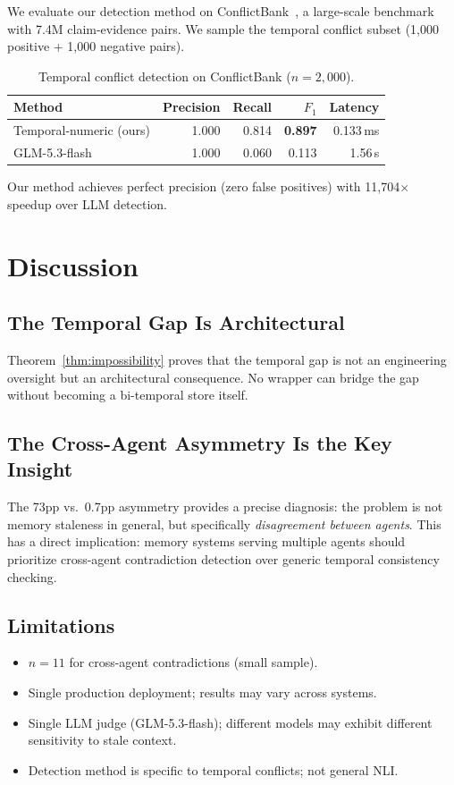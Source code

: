 \documentclass{article}
\begin{document}
We evaluate our detection method on ConflictBank~\cite{conflictbank}, a large-scale benchmark with 7.4M claim-evidence pairs. We sample the temporal conflict subset (1{,}000 positive + 1{,}000 negative pairs).

\begin{table}[h]
\centering
\caption{Temporal conflict detection on ConflictBank ($n{=}2{,}000$).}
\begin{tabular}{lrrrr}
\toprule
Method & Precision & Recall & $F_1$ & Latency \\
\midrule
Temporal-numeric (ours) & 1.000 & 0.814 & \textbf{0.897} & 0.133\,ms \\
GLM-5.3-flash & 1.000 & 0.060 & 0.113 & 1.56\,s \\
\bottomrule
\end{tabular}
\label{tab:conflictbank}
\end{table}

Our method achieves perfect precision (zero false positives) with 11{,}704$\times$ speedup over LLM detection.

\section{Discussion}
\label{sec:disc}

\subsection{The Temporal Gap Is Architectural}
Theorem~\ref{thm:impossibility} proves that the temporal gap is not an engineering oversight but an architectural consequence. No wrapper can bridge the gap without becoming a bi-temporal store itself.

\subsection{The Cross-Agent Asymmetry Is the Key Insight}
The 73pp vs.\ 0.7pp asymmetry provides a precise diagnosis: the problem is not memory staleness in general, but specifically \emph{disagreement between agents}. This has a direct implication: memory systems serving multiple agents should prioritize cross-agent contradiction detection over generic temporal consistency checking.

\subsection{Limitations}
\begin{itemize}
\item $n{=}11$ for cross-agent contradictions (small sample).
\item Single production deployment; results may vary across systems.
\item Single LLM judge (GLM-5.3-flash); different models may exhibit different sensitivity to stale context.
\item Detection method is specific to temporal conflicts; not general NLI.
\end{itemize}
\end{document}
